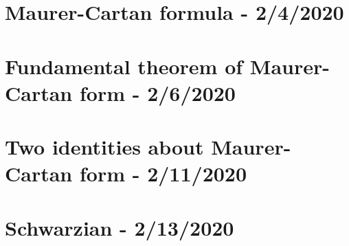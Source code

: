 \documentclass[a4paper,10pt]{article}
\begin{document}
\section{Maurer-Cartan formula - 2/4/2020}

\newpage

\section{Fundamental theorem of Maurer-Cartan form - 2/6/2020}

\newpage

\section{Two identities about Maurer-Cartan form - 2/11/2020}

\newpage

\section{Schwarzian - 2/13/2020}

\newpage


\printindex
\newpage
\end{document}
